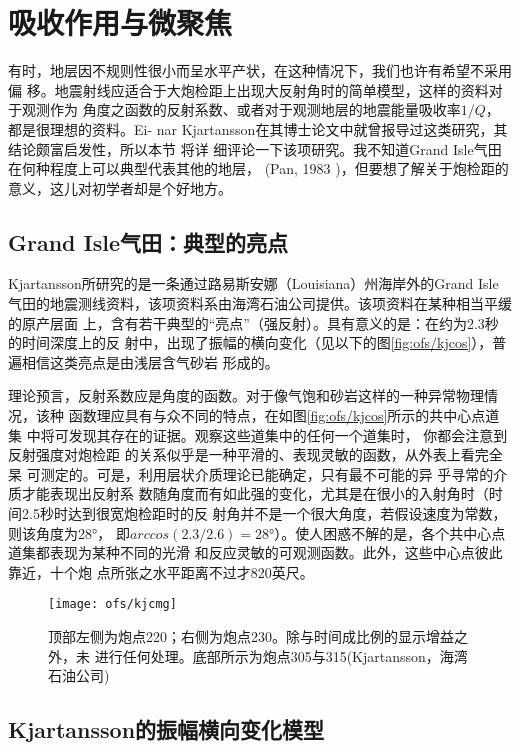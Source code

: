 \section{吸收作用与微聚焦}
\label{sec:3.1}

有时，地层因不规则性很小而呈水平产状，在这种情况下，我们也许有希望不采用偏
移。地震射线应适合于大炮检距上出现大反射角时的简单模型，这样的资料对于观测作为
角度之函数的反射系数、或者对于观测地层的地震能量吸收率$1/Q$，都是很理想的资料。Ei-
nar Kjartansson在其博士论文中就曾报导过这类研究，其结论颇富启发性，所以本节 将详
细评论一下该项研究。我不知道Grand Isle气田在何种程度上可以典型代表其他的地层， (Pan, 1983
)，但要想了解关于炮检距的意义，这儿对初学者却是个好地方。

\subsection{Grand Isle气田：典型的亮点}
\label{sec:3.1.1}

Kjartansson所研究的是一条通过路易斯安娜（Louisiana）州海岸外的Grand
Isle气田的地震测线资料，该项资料系由海湾石油公司提供。该项资料在某种相当平缓的原产层面
上，含有若干典型的“亮点”（强反射）。具有意义的是：在约为2.3秒的时间深度上的反
射中，出现了振幅的横向变化（见以下的图\ref{fig:ofs/kjcos}），普遍相信这类亮点是由浅层含气砂岩
形成的。

理论预言，反射系数应是角度的函数。对于像气饱和砂岩这样的一种异常物理情况，该种
函数理应具有与众不同的特点，在如图\ref{fig:ofs/kjcos}所示的共中心点道集
中将可发现其存在的证据。观察这些道集中的任何一个道集时，
你都会注意到反射强度对炮检距
的关系似乎是一种平滑的、表现灵敏的函数，从外表上看完全杲
可测定的。可是，利用层状介质理论已能确定，只有最不可能的异
乎寻常的介质才能表现出反射系
数随角度而有如此强的变化，尤其是在很小的入射角时（时间2.5秒时达到很宽炮检距时的反
射角并不是一个很大角度，若假设速度为常数，则该角度为28°，
即$arccos(2.3/2.6)=28°$）。使人困惑不解的是，各个共中心点道集都表现为某种不同的光滑
和反应灵敏的可观测函数。此外，这些中心点彼此靠近，十个炮
点所张之水平距离不过才820英尺。
\begin{figure}[H]
\centering
\texttt{[image: ofs/kjcmg]}
\caption[kjcmg]{顶部左侧为炮点220；右侧为炮点230。除与时间成比例的显示增益之外，未
进行任何处理。底部所示为炮点305与315(Kjartansson，海湾石油公司)}
\label{fig:ofs/kjcmg}
\end{figure}

\subsection{Kjartansson的振幅横向变化模型}
\label{sec:3.1.2}

